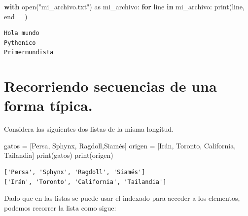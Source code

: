 \documentclass[
  spanish,
  letterpaper,
]{scrbook}
\newenvironment{Shaded}{\begin{snugshade}}{\end{snugshade}}
\newcommand{\BuiltInTok}[1]{\textcolor[rgb]{0.00,0.23,0.31}{#1}}
\newcommand{\ControlFlowTok}[1]{\textcolor[rgb]{0.00,0.23,0.31}{\textbf{#1}}}
\newcommand{\ImportTok}[1]{\textcolor[rgb]{0.00,0.46,0.62}{#1}}
\newcommand{\KeywordTok}[1]{\textcolor[rgb]{0.00,0.23,0.31}{\textbf{#1}}}
\newcommand{\NormalTok}[1]{\textcolor[rgb]{0.00,0.23,0.31}{#1}}
\newcommand{\OperatorTok}[1]{\textcolor[rgb]{0.37,0.37,0.37}{#1}}
\newcommand{\StringTok}[1]{\textcolor[rgb]{0.13,0.47,0.30}{#1}}
\theoremstyle{definition}
\theoremstyle{remark}
\begin{document}
\begin{Shaded}
\begin{Highlighting}[]
\ControlFlowTok{with} \BuiltInTok{open}\NormalTok{(}\StringTok{"mi\_archivo.txt"}\NormalTok{) }\ImportTok{as}\NormalTok{ mi\_archivo:}
    \ControlFlowTok{for}\NormalTok{ line }\KeywordTok{in}\NormalTok{ mi\_archivo:}
        \BuiltInTok{print}\NormalTok{(line, end }\OperatorTok{=} \StringTok{\textquotesingle{}\textquotesingle{}}\NormalTok{)}
\end{Highlighting}
\end{Shaded}

\begin{verbatim}
Hola mundo
Pythonico
Primermundista
\end{verbatim}

\section{Recorriendo secuencias de una forma
típica.}\label{recorriendo-secuencias-de-una-forma-tuxedpica.}

Considera las siguientes dos listas de la misma longitud.

\begin{Shaded}
\begin{Highlighting}[]
\NormalTok{gatos }\OperatorTok{=}\NormalTok{ [}\StringTok{\textquotesingle{}Persa\textquotesingle{}}\NormalTok{, }\StringTok{\textquotesingle{}Sphynx\textquotesingle{}}\NormalTok{, }\StringTok{\textquotesingle{}Ragdoll\textquotesingle{}}\NormalTok{,}\StringTok{\textquotesingle{}Siamés\textquotesingle{}}\NormalTok{]}
\NormalTok{origen }\OperatorTok{=}\NormalTok{ [}\StringTok{\textquotesingle{}Irán\textquotesingle{}}\NormalTok{, }\StringTok{\textquotesingle{}Toronto\textquotesingle{}}\NormalTok{, }\StringTok{\textquotesingle{}California\textquotesingle{}}\NormalTok{, }\StringTok{\textquotesingle{}Tailandia\textquotesingle{}}\NormalTok{]}
\BuiltInTok{print}\NormalTok{(gatos)}
\BuiltInTok{print}\NormalTok{(origen)}
\end{Highlighting}
\end{Shaded}

\begin{verbatim}
['Persa', 'Sphynx', 'Ragdoll', 'Siamés']
['Irán', 'Toronto', 'California', 'Tailandia']
\end{verbatim}

Dado que en las listas se puede usar el indexado para acceder a los
elementos, podemos recorrer la lista como sigue:
\end{document}
